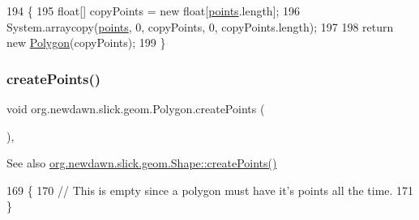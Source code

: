 \begin{DoxyCode}
194                           \{
195         \textcolor{keywordtype}{float}[] copyPoints = \textcolor{keyword}{new} \textcolor{keywordtype}{float}[\mbox{\hyperlink{classorg_1_1newdawn_1_1slick_1_1geom_1_1_shape_a8b4d4058734bbb3b96072e470b92aa37}{points}}.length];
196         System.arraycopy(\mbox{\hyperlink{classorg_1_1newdawn_1_1slick_1_1geom_1_1_shape_a8b4d4058734bbb3b96072e470b92aa37}{points}}, 0, copyPoints, 0, copyPoints.length);
197         
198         \textcolor{keywordflow}{return} \textcolor{keyword}{new} \mbox{\hyperlink{classorg_1_1newdawn_1_1slick_1_1geom_1_1_polygon_aae353d8c33cff787d8ae535036551489}{Polygon}}(copyPoints);
199     \}
\end{DoxyCode}
\mbox{\label{classorg_1_1newdawn_1_1slick_1_1geom_1_1_polygon_a9486424a7f53b58bcaee9bd80ecdb1f7}} 
\subsubsection{\texorpdfstring{create\+Points()}{createPoints()}}
{\footnotesize\ttfamily void org.\+newdawn.\+slick.\+geom.\+Polygon.\+create\+Points (\begin{DoxyParamCaption}{ }\end{DoxyParamCaption})\hspace{0.3cm}{\ttfamily [inline]}, {\ttfamily [protected]}}

\begin{DoxySeeAlso}{See also}
\mbox{\hyperlink{classorg_1_1newdawn_1_1slick_1_1geom_1_1_shape_a2f5907ca87e87f8794161f46389ff8c8}{org.\+newdawn.\+slick.\+geom.\+Shape\+::create\+Points()}} 
\end{DoxySeeAlso}

\begin{DoxyCode}
169                                   \{
170 \textcolor{comment}{//      This is empty since a polygon must have it's points all the time.}
171     \}
\end{DoxyCode}
\mbox{\label{classorg_1_1newdawn_1_1slick_1_1geom_1_1_polygon_a5e745ea14644224278b2d66a313db704}} 
